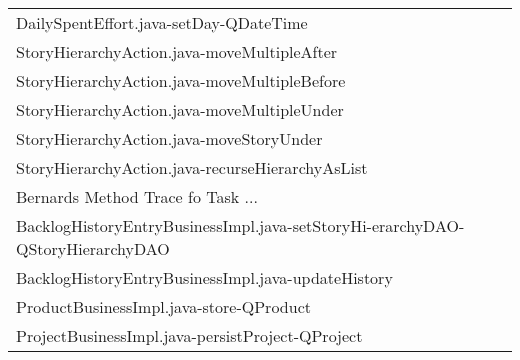 \begin{table}[t!]
\begin{tabular}{@{\hspace{2pt}}l@{\hspace{2pt}}}
     DailySpentEffort.java-setDay-QDateTime                                                                                \\%
     StoryHierarchyAction.java-moveMultipleAfter                                                                                 \\%
     StoryHierarchyAction.java-moveMultipleBefore                                                                                \\%
     StoryHierarchyAction.java-moveMultipleUnder                                                                                 \\%
     StoryHierarchyAction.java-moveStoryUnder                                                                                    \\%
     StoryHierarchyAction.java-recurseHierarchyAsList                                                                            \\%
%
%
\midrule
\midrule
Bernards Method Trace fo Task ... \\%
 \midrule
     BacklogHistoryEntryBusinessImpl.java-setStoryHi-erarchyDAO-QStoryHierarchyDAO \\%
     BacklogHistoryEntryBusinessImpl.java-updateHistory                          \\%
     ProductBusinessImpl.java-store-QProduct                                    \\%
     ProjectBusinessImpl.java-persistProject-QProject                             \\%

\end{tabular}
\end{table}
